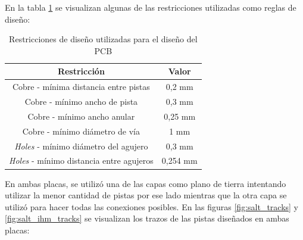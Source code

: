 En la tabla \ref{tab:design_constraints} se visualizan algunas de las restricciones utilizadas como reglas de diseño:

\begin{table}[H]
    \centering
    \begin{tabular}{|c|c|}
        \hline
         \textbf{Restricción} & \textbf{Valor}  \\ \hline
         Cobre - mínima distancia entre pistas & 0,2 mm  \\ \hline
         Cobre - mínimo ancho de pista & 0,3 mm  \\ \hline
         Cobre - mínimo ancho anular  & 0,25 mm  \\ \hline
         Cobre - mínimo diámetro de vía  & 1 mm  \\ \hline
         \textit{Holes} - mínimo diámetro del agujero & 0,3 mm \\ \hline
         \textit{Holes} - mínimo distancia entre agujeros & 0,254 mm \\
         \hline
    \end{tabular}
    \caption{Restricciones de diseño utilizadas para el diseño del PCB}
    \label{tab:design_constraints}
\end{table}


En ambas placas, se utilizó una de las capas como plano de tierra intentando utilizar la menor cantidad de pistas por ese lado mientras que la otra capa se utilizó para hacer todas las conexiones posibles. En las figuras \ref{fig:salt_tracks} y \ref{fig:salt_ihm_tracks} se visualizan los trazos de las pistas diseñados en ambas placas: 


